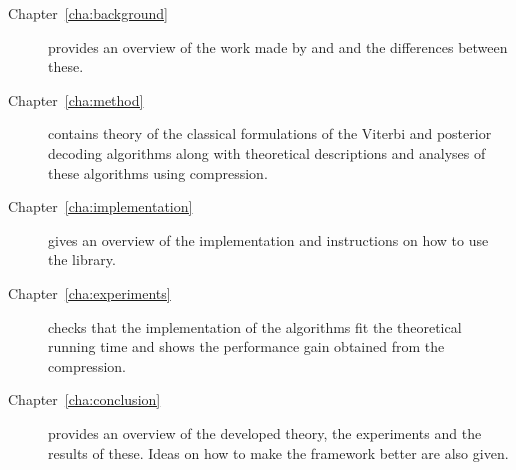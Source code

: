 \begin{description}
\item[Chapter~\ref{cha:background}] provides an overview of the work made by
  \citet{lifshits2009speeding} and \citet{sand2013ziphmmlib} and the differences
  between these.
\item[Chapter~\ref{cha:method}] contains theory of the classical formulations
  of the Viterbi and posterior decoding algorithms along with theoretical
  descriptions and analyses of these algorithms using compression.
\item[Chapter~\ref{cha:implementation}] gives an overview of the implementation
  and instructions on how to use the library.
\item[Chapter~\ref{cha:experiments}] checks that the implementation of the
  algorithms fit the theoretical running time and shows the performance gain
  obtained from the compression.
\item[Chapter~\ref{cha:conclusion}] provides an overview of the developed
  theory, the experiments and the results of these. Ideas on how to
  make the framework better are also given.
\end{description}


